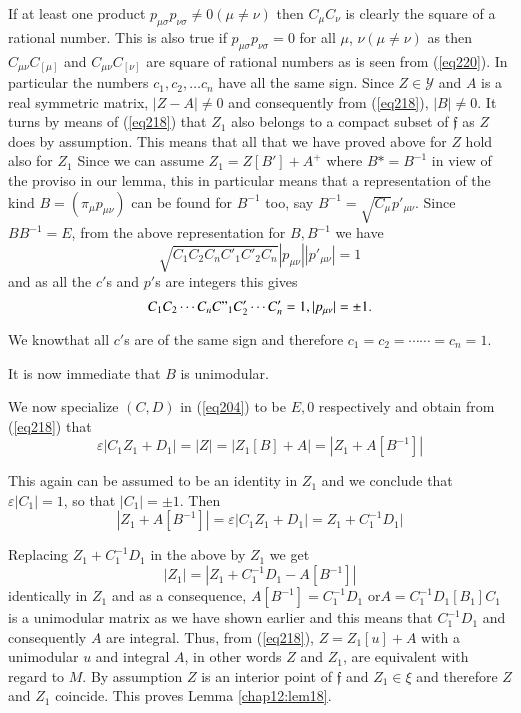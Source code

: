 If at least  one product $p_{\mu \sigma} p_{\nu \sigma} \neq 0 (\mu
\neq \nu)$ then $C_{\mu} C_{\nu}$ is clearly the square of a rational
number. This is also true if $p_{\mu \sigma} p_{\nu \sigma} = 0$ for
all $\mu$, $\nu (\mu \neq \nu)$ as then $C_{\mu \nu} C_[\mu]$ and
$C_{\mu \nu} C_[\nu]$ are square of rational numbers as is seen from
(\ref{eq220}). In particular the numbers $c_1 , c_2, \ldots c_n$ have all
the same sign. Since $Z \in \mathscr{Y}$ and $A$ is a real symmetric
matrix, $|Z - A| \neq 0$ and consequently from (\ref{eq218}), $|B| \neq
0$. It turns by means of (\ref{eq218}) that $Z_1$ also belongs to a compact
subset of $\mathfrak{f}$ as $Z$ does by assumption. This means that
all that we have proved above for $Z$ hold also for $Z_1$ Since we can
assume $Z_1 = Z [B'] + A^+$ where $B* = B^{-1}$ in view of the proviso
in our lemma, this in particular means that a representation of the
kind $B = (\pi_{\mu} p_{\mu \nu})$ can be found for $B^{-1}$ too, say
$B^{-1} = \sqrt{C_{\mu}} p'_{\mu \nu}$. Since $B B^{-1} = E$, from the
above representation for $B, B^{-1}$ we have 
$$
\sqrt{C_1 C_2 C_n C'_1 C'_2  C_n} |p_{\mu \nu}| | p'_{\mu \nu}| = 1 
$$
and as all the $c'$s and $p'$s are integers this gives
$$
C_1 C_2 \cdots C_n C"_1 C'_2 \cdots C'_n = 1 , |p_{\mu \nu}|= \pm 1.
$$

We know\pageoriginale that all $c'$s are of the same sign and
therefore $c_1 = c_2 = \cdots \cdots = c_n = 1$.  

It is now immediate that $B$ is unimodular.

We now specialize $(C, D)$ in (\ref{eq204}) to be $E , 0$ respectively and
obtain from (\ref{eq218}) that 
$$
\varepsilon |C_1 Z_1 + D_1| = |Z| = |Z _1 [B] + A | = |Z_1 + A
            [B^{-1}] | 
$$

This again can be assumed to be an identity in $Z_1$ and we conclude
that $\varepsilon |C_1| = 1$, so that $|C_1| = \pm 1$. Then 
$$
|Z_1 + A [B^{-1}] | = \varepsilon |C_1 Z_1 + D_1 | = Z_1 + C_1^{-1} D_1 |
$$

Replacing $Z_1 + C_1^{-1} D_1$ in the above by $Z_1$ we get  
$$
|Z_1| = |Z_1 + C_1^{-1} D_1 - A[B^{-1}] |
$$
identically in $Z_1$ and as a consequence, $A[B^{-1}] = C_1^{-1} D_1$
or\break $A = C_1^{-1}D_1 [B_1] C_1$ is a unimodular matrix as we have shown
earlier and this means that $C_1^{-1} D_1$ and consequently $A$ are
integral. Thus, from (\ref{eq218}), $Z = Z_1 [u] + A$ with a unimodular $u$ and
integral $A$, in other words $Z$ and $Z_1$, are equivalent with regard
to $M$. By assumption $Z$ is an interior point of $\mathfrak{f}$ and
$Z_1 \in \xi$ and therefore $Z$ and $Z_1$ coincide. This proves Lemma
\ref{chap12:lem18}. 

